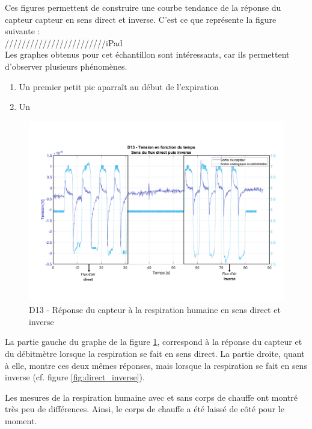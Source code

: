 Ces figures permettent de construire une courbe tendance de la réponse du capteur \gls{capteur} en sens direct et inverse. C'est ce que représente 
la figure suivante :\\

////////////////////////iPad\\

Les graphes obtenus pour cet échantillon sont intéressants, car ils permettent d'observer plusieurs phénomènes. \\
\begin{enumerate}
    \item Un premier petit pic aparraît au début de l'expiration
    \item Un
\end{enumerate}

\begin{figure}[H]
    \centering
    \includegraphics[scale = 0.6]{assets/figures/D13_human_breath_direct_invert_blue.pdf}
    \caption{D13 - Réponse du capteur à la respiration humaine en sens direct et inverse}
    \label{fig:D13_human_breath_direct_invert}
\end{figure}

La partie gauche du graphe de la figure \ref{fig:D13_human_breath_direct_invert}, correspond à la réponse du capteur et du débitmètre lorsque la 
respiration se fait en sens direct. La partie droite, quant à elle, montre ces deux mêmes réponses, mais lorsque la respiration se fait en sens 
inverse (cf. figure \ref{fig:direct_inverse}). 

Les mesures de la respiration humaine avec et sans corps de chauffe ont montré très peu de différences. Ainsi, le corps de chauffe a été laissé 
de côté pour le moment. 

